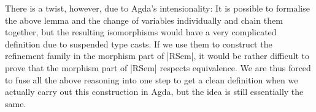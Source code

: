 There is a twist, however, due to Agda's intensionality: It is possible to formalise the above lemma and the change of variables individually and chain them together, but the resulting isomorphisms would have a very complicated definition due to suspended type casts.
If we use them to construct the refinement family in the morphism part of |RSem|, it would be rather difficult %
to prove that the morphism part of |RSem| respects equivalence.
We are thus forced to fuse all the above reasoning into one step to get a clean definition when we actually carry out this construction in Agda, but the idea is still essentially the same.


